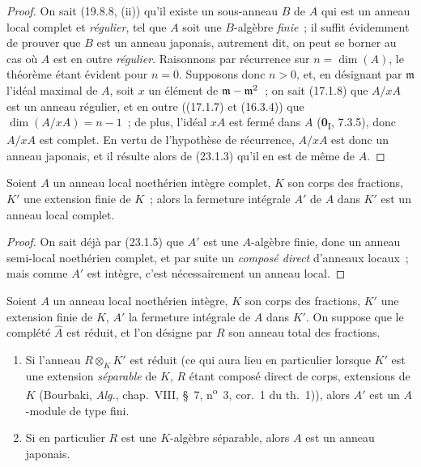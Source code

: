 \begin{proof}
On sait (19.8.8, (ii)) qu'il existe un sous-anneau $B$ de $A$ qui est un
anneau local complet et \emph{régulier}, tel que $A$ soit une $B$-algèbre \emph{finie}~; il
suffit évidemment de prouver
que $B$ est un anneau japonais, autrement dit, on peut se borner au cas où
$A$ est en outre \emph{régulier}. Raisonnons par récurrence sur
$n=\dim(A)$, le théorème étant évident pour $n=0$. Supposons donc $n>0$, et,
en désignant par $\mathfrak m$ l'idéal maximal de $A$, soit $x$ un élément de
$\mathfrak m-\mathfrak m^2$~; on sait (17.1.8) que $A/xA$ est un anneau
régulier, et en outre ((17.1.7) et (16.3.4)) que
$\dim(A/xA)=n-1$~; de plus, l'idéal $xA$ est fermé dans $A$
(\textbf{0}\textsubscript{I}, 7.3.5), donc $A/xA$ est complet. En vertu de l'hypothèse
de récurrence, $A/xA$ est donc un anneau japonais, et il résulte alors de
(23.1.3) qu'il en est de même de $A$.
\end{proof}

\begin{corollary}[23.1.6]
\label{0.23.1.6-fr}
Soient $A$ un anneau local noethérien intègre complet, $K$ son corps des
fractions, $K'$ une extension finie de $K$~; alors la fermeture intégrale
$A'$ de $A$ dans $K'$ est un anneau local complet.
\end{corollary}

\begin{proof}
On sait déjà par (23.1.5) que $A'$ est une $A$-algèbre finie, donc un anneau
semi-local noethérien complet, et par suite un \emph{composé direct}
d'anneaux locaux~; mais comme $A'$ est intègre, c'est nécessairement un
anneau local.
\end{proof}

\begin{proposition}[23.1.7]
\label{0.23.1.7-fr}
Soient $A$ un anneau local noethérien intègre, $K$ son corps des fractions,
$K'$ une extension finie de $K$, $A'$ la fermeture intégrale de $A$ dans
$K'$. On suppose que le complété $\widehat A$ est \textup{réduit}, et l'on désigne par
$R$ son anneau total des fractions.
\begin{enumerate}
  \item[\textup{(i)}] Si l'anneau $R\otimes_KK'$ est réduit \textup{(ce qui aura lieu en
  particulier lorsque $K'$ est une extension \emph{séparable} de $K$, $R$ étant
  composé direct de corps, extensions de $K$ (Bourbaki, \emph{Alg.},
  chap.~VIII, §~7, n\textsuperscript{o}~3, cor.~1 du th.~1))}, alors $A'$ est
  un $A$-module de type fini.
  \item[\textup{(ii)}] Si en particulier $R$ est une $K$-algèbre séparable, alors $A$
  est un anneau japonais.
\end{enumerate}
\end{proposition}

